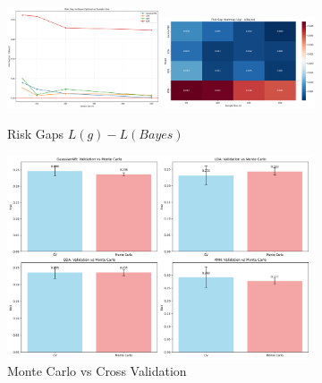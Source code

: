 \documentclass[10pt]{article}
\begin{document}
\newpage

\begin{figure}[!ht]
    \centering
    \includegraphics[width=0.4\textwidth]{./Parte 2/figures/risk_gaps.png}
    \includegraphics[width=0.4\textwidth]{./Parte 2/figures/risk_gap_heatmap.png}
    \caption{Risk Gaps $L(g) - L(Bayes)$}
    \label{fig:risk-gaps-images}
\end{figure}

\begin{figure}[!ht]
    \centering
    \includegraphics[width=0.8\textwidth]{./Parte 2/figures/validation_comparison.png}
    \caption{Monte Carlo vs Cross Validation}
    \label{fig:mc-vs-cv}
\end{figure}


\end{document}
